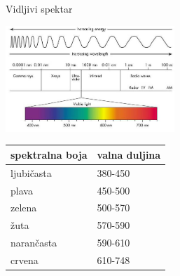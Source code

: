 \documentclass[9pt]{beamer}
\begin{document}
\begin{frame}{Vidljivi spektar}
	\begin{center}
		\includegraphics[height=4cm]{slike/spektar.png}
	\end{center}
	\begin{center}
		\begin{tabular}{ll}\hline
			spektralna boja & valna duljina\\\hline
			ljubičasta & 380-450\\
			plava & 450-500\\
			zelena & 500-570\\
			žuta & 570-590\\
			narančasta & 590-610\\
			crvena & 610-748 
		\end{tabular}
	\end{center}
\end{frame}
\end{document}
